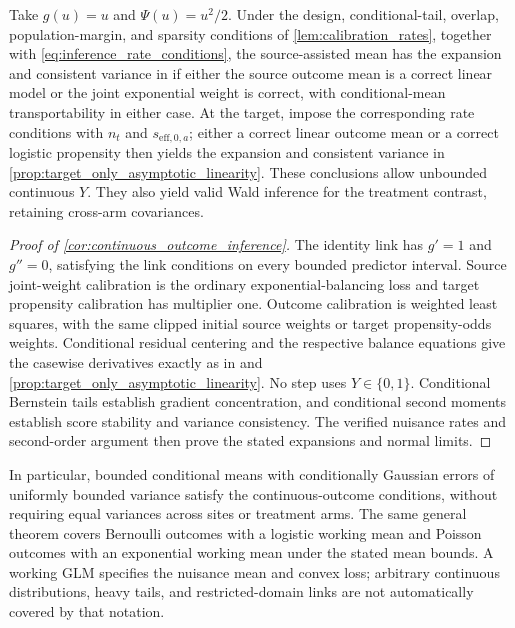 \documentclass[12pt]{article}
\begin{document}
\begin{corollary}\label{cor:continuous_outcome_inference}
Take $g(u)=u$ and $\Psi(u)=u^2/2$. Under the design, conditional-tail, overlap, population-margin, and sparsity conditions of \cref{lem:calibration_rates}, together with \cref{eq:inference_rate_conditions}, the source-assisted mean has the expansion and consistent variance in  if either the source outcome mean is a correct linear model or the joint exponential weight is correct, with conditional-mean transportability in either case. At the target, impose the corresponding rate conditions with $n_t$ and $s_{\mathrm{eff},0,a}$; either a correct linear outcome mean or a correct logistic propensity then yields the expansion and consistent variance in \cref{prop:target_only_asymptotic_linearity}. These conclusions allow unbounded continuous $Y$. They also yield valid Wald inference for the treatment contrast, retaining cross-arm covariances.
\end{corollary}
\begin{proof}[Proof of \cref{cor:continuous_outcome_inference}]
The identity link has $g'=1$ and $g''=0$, satisfying the link conditions on every bounded predictor interval. Source joint-weight calibration is the ordinary exponential-balancing loss and target propensity calibration has multiplier one. Outcome calibration is weighted least squares, with the same clipped initial source weights or target propensity-odds weights. Conditional residual centering and the respective balance equations give the casewise derivatives exactly as in  and \cref{prop:target_only_asymptotic_linearity}. No step uses $Y\in\{0,1\}$. Conditional Bernstein tails establish gradient concentration, and conditional second moments establish score stability and variance consistency. The verified nuisance rates and second-order argument then prove the stated expansions and normal limits.
\end{proof}

In particular, bounded conditional means with conditionally Gaussian errors of uniformly bounded variance satisfy the continuous-outcome conditions, without requiring equal variances across sites or treatment arms. The same general theorem covers Bernoulli outcomes with a logistic working mean and Poisson outcomes with an exponential working mean under the stated mean bounds. A working GLM specifies the nuisance mean and convex loss; arbitrary continuous distributions, heavy tails, and restricted-domain links are not automatically covered by that notation.
\end{document}
